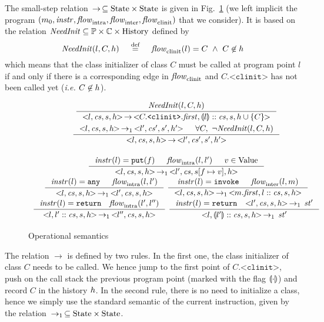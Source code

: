 \documentclass{entcs}
\newcommand{\clinit}{\ensuremath{\texttt{<clinit>}}}
\newcommand{\flow}{\mathit{flow}}
\newcommand{\intraflow}{\flow_{\rm intra}}
\newcommand{\interflow}{\flow_{\rm inter}}
\newcommand{\clinitflow}{\flow_{\rm clinit}}
\begin{document}
\newcommand{\Reach}[2]{\mathit{Reach}(#1,#2)}
\newcommand{\stepi}{\,\to_1\,} \newcommand{\stepii}{\,\to_2\,}
\newcommand{\step}{\,\to\,} \newcommand{\dom}{\operatorname{dom}}
\newcommand{\stepstar}{\,\to^\star\,}
\newcommand{\NeedInit}{\mathit{NeedInit}}
\newcommand{\ia}[1]{\llbracket{#1}\rrbracket}
\newcommand{\init}{\mathrm{init}} \newcommand{\inA}{\mathrm{in}}
\newcommand{\callA}{\mathrm{call}} \newcommand{\outA}{\mathrm{out}}


The small-step relation $\step \subseteq \State\times\State$ is given
in Fig.~\ref{fig:sem} (we left implicit the program
$(m_0,\instrAt,\intraflow,\interflow,\clinitflow)$ that we consider).
It is based on the relation
$\NeedInit\subseteq\ppt\times\class\times\History$ defined by
$$
\NeedInit(l,C,\hist)\quad \eqdef \quad \clinitflow(l)=C~ \land~
C\not\in\hist
$$
which means that the class initializer of class $C$ must be called at
program point $l$ if and only if there is a corresponding edge in
$\clinitflow$ and $C.\clinit$ has not been called yet (\emph{i.e.}
$C\not\in h$).

\begin{figure}
$$
\begin{array}[c]{c}
\inference {\NeedInit(l,C,\hist)}{\st{l,\cs,s,\hist} \step \st{C.\clinit.\first,\marked{l}::\cs,s,\hist\cup\{C\}}}\\[2.5ex]
  \inference {\st{l,\cs,s,\hist} \stepi \st{l',\cs',s',\hist'} & \forall C,\ \neg\NeedInit(l,C,\hist)}{\st{l,\cs,s,\hist} \step \st{l',\cs',s',\hist'}}\\[5ex]
  \inference {\instrAt(l)=\putS(f)  & \intraflow(l,l') & v\in\Value}
  {\st{l,\cs,s,\hist} \stepi \st{l',\cs,s[f\mapsto v],\hist}}\\[2ex]
  \inference {\instrAt(l)=\any  & \intraflow(l,l')}{\st{l,\cs,s,\hist} \stepi \st{l',\cs,s,\hist}}~
  \inference {\instrAt(l)=\invoke & \interflow(l,m)}{\st{l,\cs,s,\hist} \stepi \st{m.\first,l::\cs,s,\hist}}\\[2ex]
  \inference {\instrAt(l)=\return &\!\!\! \intraflow(l',l'')}{\st{l,l'::\cs,s,\hist} \stepi \st{l'',\cs,s,\hist}}~
  \inference {\instrAt(l)=\return &\!\!\! \st{l',\cs,s,\hist} \stepi \stt'}{\st{l,\marked{l'}::\cs,s,\hist} \stepi \stt'}\\[2ex]
\end{array}
$$  
\caption{Operational semantics}
\label{fig:sem}
\end{figure}

The relation $\to$ is defined by two rules.  In the first one, the
class initializer of class $C$ needs to be called.  We hence jump to
the first point of $C.\clinit$, push on the call stack the previous
program point (marked with the flag $\llparenthesis \cdot \rrparenthesis$) and record $C$
in the history $h$.  In the second rule, there is no need to
initialize a class, hence we simply use the standard semantic of the
current instruction, given by the relation
$\stepi\subseteq\State\times\State$.
\end{document}
